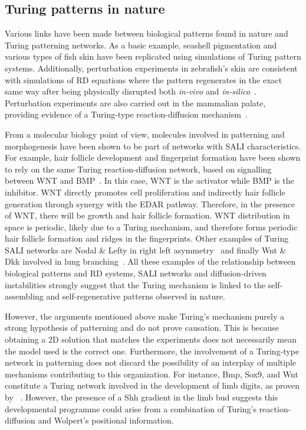 \subsection{Turing patterns in nature}\label{Turing patterns in nature}
Various links have been made between biological patterns found in nature and Turing patterning networks.
As a basic example, seashell pigmentation and various types of fish skin have been replicated using simulations of Turing pattern systems.
Additionally, perturbation experiments in zebrafish’s skin are consistent with simulations of RD equations where the pattern regenerates in the exact same way after being physically disrupted both \textit{in-vivo} and \textit{in-silico}~\parencite{Kondo2010a}.
Perturbation experiments are also carried out in the mammalian palate, providing evidence of a Turing-type reaction-diffusion mechanism~\parencite{Economou2012}.

From a molecular biology point of view, molecules involved in patterning and morphogenesis have been shown to be part of networks with SALI characteristics.
For example, hair follicle development and fingerprint formation have been shown to rely on the same Turing reaction-diffusion network, based on signalling between WNT and BMP~\parencite{Glover2023}.
In this case, WNT is the activator while BMP is the inhibitor.
WNT directly promotes cell proliferation and indirectly hair follicle generation through synergy with the EDAR pathway.
Therefore, in the presence of WNT, there will be growth and hair follicle formation.
WNT distribution in space is periodic, likely due to a Turing mechanism, and therefore forms periodic hair follicle formation and ridges in the fingerprints.
Other examples of Turing SALI networks are Nodal \& Lefty in right left asymmetry~\parencite{Nakamura2006} and finally Wnt \& Dkk involved in lung branching~\parencite{langhe2005_lung}.
All these examples of the relationship between biological patterns and RD systems, SALI networks and diffusion-driven instabilities strongly suggest that the Turing mechanism is linked to the self-assembling and self-regenerative patterns observed in nature.

However, the arguments mentioned above make Turing’s mechanism purely a strong hypothesis of patterning and do not prove causation.
This is because obtaining a 2D solution that matches the experiments does not necessarily mean the model used is the correct one.
Furthermore, the involvement of a Turing-type network in patterning does not discard the possibility of an interplay of multiple mechanisms contributing to this organization.
For instance, Bmp, Sox9, and Wnt constitute a Turing network involved in the development of limb digits, as proven by ~\cite{Raspopovic1}.
However, the presence of a Shh gradient in the limb bud suggests this developmental programme could arise from a combination of Turing's reaction-diffusion and Wolpert's positional information.

